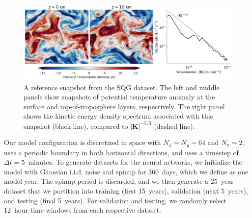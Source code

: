 \begin{figure}
    \centering
    \includegraphics[width=\textwidth]{../figures/sqg_reference_plot.jpg}
    \caption{A reference snapshot from the SQG dataset. The left and middle panels
        show snapshots of potential temperature anomaly at the surface and
        top-of-troposphere layers, respectively.
        The right panel shows the kinetic energy density spectrum associated
        with this snapshot (black line), compared to
        $|\mathbf{K}|^{-5/3}$ (dashed line).
    }
    \label{fig:sqg-reference}
\end{figure}

Our model configuration is discretized in space with $N_x = N_y = 64$ and $N_{z}=2$,
uses a periodic boundary in both horizontal directions,
and uses a timestep of $\Delta t=5$~minutes.
To generate datasets for the neural networks, we initialize the model with Gaussian i.i.d.
noise and spinup for 360~days, which we define as one model year.
The spinup period is discarded, and we then generate a 25~year dataset that we partition
into training (first 15~years), validation (next 5~years), and testing
(final 5~years).
For validation and testing, we randomly select 12~hour time windows from each
respective dataset.
